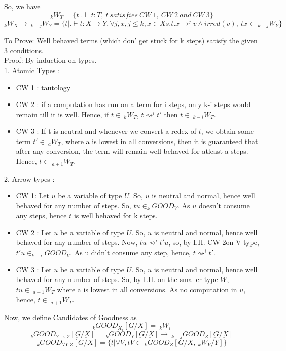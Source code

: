 \documentclass[12pt]{article}
\begin{document}
So, we have\\
$$
 _kW_T = \{t | . \vdash t : T,\ t\ satisfies\ CW\ 1,\ CW\ 2\ and\ CW\ 3\}
$$
$$
_kW_X \rightarrow\ _{k-j}W_Y = \{t | . \vdash t : X \rightarrow
Y,\forall j,x, j \leq k, x \in X s.t. x \rightarrow^j v \wedge
irred(v),\ tx \in\ _{k-j}W_Y \}
$$

To Prove: Well behaved terms (which don' get stuck for k steps)
satisfy the given 3 conditions.\\
Proof: By induction on types.\\
1. Atomic Types :
 \begin{itemize}
\item CW 1 : tautology
\item CW 2 : if a computation has run on a term for i steps, only k-i
  steps would remain till it is well. Hence, if $t \in\  _kW_T$, $t \rightsquigarrow^i t'$ then $t \in\
_{k-i}W_T$.
\item CW 3 : If t is neutral and whenever we convert a redex of $t$, we obtain
some term $t' \in\  _aW_T$, where a is lowest in all conversions, then
it is guaranteed that after any conversion, the term will remain well
behaved for atleast a steps. Hence, $t \in\  _{a+1}W_T$.
\end{itemize}

\vspace

2. Arrow types :
\begin{itemize}
\item CW 1: Let $u$ be a variable of type $U$. So, $u$ is neutral and
  normal, hence well behaved for any number of steps. So, $tu \in
  _kGOOD_V$. As $u$ doesn't consume any steps, hence $t$ is well
  behaved for k steps.
\item CW 2 :  Let $u$ be a variable of type $U$. So, $u$ is neutral and
  normal, hence well behaved for any number of steps. Now, $tu
  \rightsquigarrow^i t'u$, so, by I.H. CW 2on V type, $t'u \in
  _{k-i}GOOD_V$. As u didn't consume any step, hence, $t
  \rightsquigarrow^i t'$.
\item CW 3 :  Let $u$ be a variable of type $U$. So, $u$ is neutral and
  normal, hence well behaved for any number of steps. So, by I.H. on
  the smaller type $W$, $tu \in\ _{a+1}W_T$ where a is lowest in all
  conversions. As no computation in $u$, hence, $t \in\ _{a+1}W_T$.
\end{itemize}


Now, we define Candidates of Goodness as\\
$$
_kGOOD_{X_i}[\underbar{G}/\underbar{X}] =\ _kW_i
$$
$$
_kGOOD_{Y \rightarrow Z}[\underbar{G}/\underbar{X}] =\ _kGOOD_Y[\underbar{G}/\underbar{X}] \rightarrow\ _{k-j}GOOD_Z[\underbar{G}/\underbar{X}]
$$
$$
_kGOOD_{\forall Y.Z}[\underbar{G}/\underbar{X}] = \{t | \forall V, tV
\in\ _kGOOD_Z[\underbar{G}/\underbar{X},\ _kW_V/Y]\}
$$
\end{document}
